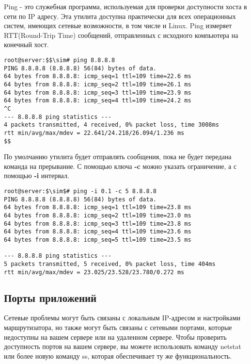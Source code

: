 \documentclass[14pt, a4paper]{article}
\begin{document}
Ping - это служебная программа, используемая для проверки доступности хоста в сети по IP адресу.
Эта утилита доступна практически для всех операционных систем, имеющих сетевые возможности, в
том числе и Linux. Ping измеряет RTT(Round-Trip Time) сообщений, отправленных с исходного
компьютера на конечный хост.

\vspace{0.3cm}
\begin{lstlisting}
root@server:$$\sim# ping 8.8.8.8
PING 8.8.8.8 (8.8.8.8) 56(84) bytes of data.
64 bytes from 8.8.8.8: icmp_seq=1 ttl=109 time=22.6 ms
64 bytes from 8.8.8.8: icmp_seq=2 ttl=109 time=26.1 ms
64 bytes from 8.8.8.8: icmp_seq=3 ttl=109 time=23.9 ms
64 bytes from 8.8.8.8: icmp_seq=4 ttl=109 time=24.2 ms
^C
--- 8.8.8.8 ping statistics ---
4 packets transmitted, 4 received, 0% packet loss, time 3008ms
rtt min/avg/max/mdev = 22.641/24.218/26.094/1.236 ms
$$
\end{lstlisting}
\vspace{0.2cm}

По умолчанию утилита будет отправлять сообщения, пока не будет передана команда на прерывание.
С помощью ключа \textbf{-c} можно указать ограничение, а с помощью \textbf{-i} интервал.

\vspace{0.3cm}
\begin{lstlisting}
root@server:$\sim$# ping -i 0.1 -c 5 8.8.8.8
PING 8.8.8.8 (8.8.8.8) 56(84) bytes of data.
64 bytes from 8.8.8.8: icmp_seq=1 ttl=109 time=23.8 ms
64 bytes from 8.8.8.8: icmp_seq=2 ttl=109 time=23.0 ms
64 bytes from 8.8.8.8: icmp_seq=3 ttl=109 time=23.8 ms
64 bytes from 8.8.8.8: icmp_seq=4 ttl=109 time=23.6 ms
64 bytes from 8.8.8.8: icmp_seq=5 ttl=109 time=23.5 ms

--- 8.8.8.8 ping statistics ---
5 packets transmitted, 5 received, 0% packet loss, time 404ms
rtt min/avg/max/mdev = 23.025/23.528/23.780/0.272 ms
\end{lstlisting}
\vspace{0.2cm}

\subsection*{Порты приложений} 

Сетевые проблемы могут быть связаны с локальным IP-адресом и настройками маршрутизатора, но
также могут быть связаны с сетевыми портами, которые недоступны на вашем сервере или на
удаленном сервере. Чтобы проверить доступность портов на вашем сервере, вы можете использовать
команду \colorbox{backcolour}{netstat} или более новую команду \colorbox{backcolour}{ss}, которая обеспечивает ту же функциональность.
\newpage
\end{document}
